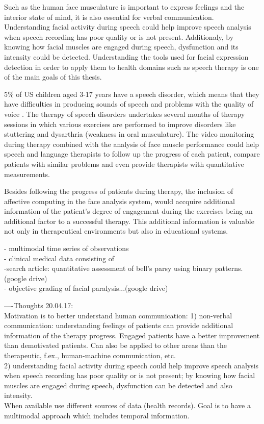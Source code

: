 Such as the human face musculature is important to express feelings and the interior state of mind, it is also essential for verbal communication. Understanding facial activity during speech could help improve speech analysis when speech recording has poor quality or is not present. Additionaly, by knowing how facial muscles are engaged during speech, dysfunction and its intensity could be detected. Understanding the tools used for facial expression detection in order to apply them to health domains such as speech therapy is one of the main goals of this thesis.

5\% of US children aged 3-17 years have a  speech disorder, which means that they have difficulties in producing sounds of speech and problems with the quality of voice \cite{SpeechStatistics}. The therapy of speech disorders undertakes several months of therapy sessions in which various exercises are performed to improve disorders like stuttering and dysarthria (weakness in oral musculature). The video monitoring during therapy combined with the analysis of face muscle performance could help speech and language therapists to follow up the progress of each patient, compare patients with similar problems and even provide therapists with quantitative measurements. 

 
Besides following the progress of patients during therapy, the inclusion of affective computing in the face analysis system, would accquire additional information of the patient's degree of engagement during the exercises being an additional factor to a successful therapy. This additional information is valuable not only in therapeutical environments but also in educational systems.


- multimodal time series of observations\\
- clinical medical data consisting of \\


-search article: quantitative assessment of bell's parsy using binary patterns. (google drive)\\
- objective grading of facial paralysis...(google drive)

----Thoughts 20.04.17:\\
Motivation is to better understand human communication: 1) non-verbal communication: understanding feelings of patients can provide additional information of the therapy progress. Engaged patients have a better improvement than demotivated patients. Can also be applied to other areas than the therapeutic, f.ex., human-machine communication, etc. \\
2) understanding facial activity during speech could help improve speech analysis when speech recording has poor quality or is not present; by knowing how facial muscles are engaged during speech, dysfunction can be detected and also intensity.\\
When available use different sources of data (health records). Goal is to have a multimodal approach which includes temporal information. 

